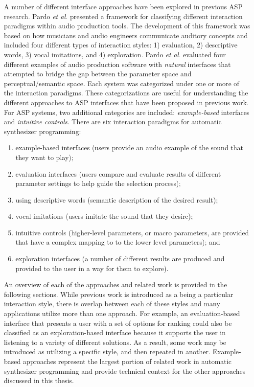 A number of different interface approaches have been explored in previous ASP research. Pardo \textit{et al.} \cite{pardo2019learning} presented a framework for classifying different interaction paradigms within audio production tools. The development of this framework was based on how musicians and audio engineers communicate auditory concepts and included four different types of interaction styles: 1) evaluation, 2) descriptive words, 3) vocal imitations, and 4) exploration. Pardo \textit{et al.} evaluated four different examples of audio production software with \textit{natural} interfaces that attempted to bridge the gap between the parameter space and perceptual/semantic space. Each system was categorized under one or more of the interaction paradigms. These categorizations are useful for understanding the different approaches to ASP interfaces that have been proposed in previous work. For ASP systems, two additional categories are included: \textit{example-based} interfaces and \textit{intuitive controls}. There are six interaction paradigms for automatic synthesizer programming:

\begin{enumerate}
    \item example-based interfaces (users provide an audio example of the sound that they want to play);
    \item evaluation interfaces (users compare and evaluate results of different parameter settings to help guide the selection process);
    \item using descriptive words (semantic description of the desired result);
    \item vocal imitations (users imitate the sound that they desire);
    \item intuitive controls (higher-level parameters, or macro parameters, are provided that have a complex mapping to to the lower level parameters); and
    \item exploration interfaces (a number of different results are produced and provided to the user in a way for them to explore).
\end{enumerate}

An overview of each of the approaches and related work is provided in the following sections. While previous work is introduced as a being a particular interaction style, there is overlap between each of these styles and many applications utilize more than one approach. For example, an evaluation-based interface that presents a user with a set of options for ranking could also be classified as an exploration-based interface because it supports the user in listening to a variety of different solutions. As a result, some work may be introduced as utilizing a specific style, and then repeated in another. Example-based approaches represent the largest portion of related work in automatic synthesizer programming and provide technical context for the other approaches discussed in this thesis.

